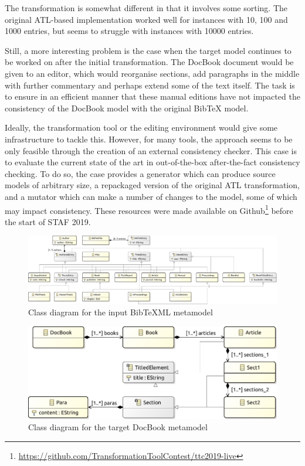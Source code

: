 \documentclass[a4paper]{article}
\begin{document}
The transformation is somewhat different in that it involves some sorting. The
original ATL-based implementation worked well for instances with 10, 100 and
1000 entries, but seems to struggle with instances with 10000 entries.

Still, a more interesting problem is the case when the target model continues to
be worked on after the initial transformation. The DocBook document would be
given to an editor, which would reorganise sections, add paragraphs in the
middle with further commentary and perhaps extend some of the text itself. The
task is to ensure in an efficient manner that these manual editions have not
impacted the consistency of the DocBook model with the original BibTeX model.

Ideally, the transformation tool or the editing environment would give some
infrastructure to tackle this. However, for many tools, the approach seems to be
only feasible through the creation of an external consistency checker. This case
is to evaluate the current state of the art in out-of-the-box after-the-fact
consistency checking. To do so, the case provides a generator which can produce
source models of arbitrary size, a repackaged version of the original ATL
transformation, and a mutator which can make a number of changes to the model,
some of which may impact consistency. These resources were made available on
Github\footnote{\url{https://github.com/TransformationToolContest/ttc2019-live}}
before the start of STAF 2019.

\begin{figure}
  \centering
  \includegraphics[width=\textwidth]{bibtex}
  \caption{Class diagram for the input BibTeXML metamodel}
  \label{fig:bibtex-mm}
\end{figure}

\begin{figure}
  \centering
  \includegraphics[width=.5\textwidth]{docbook}
  \caption{Class diagram for the target DocBook metamodel}
  \label{fig:docbook-mm}
\end{figure}
\end{document}
